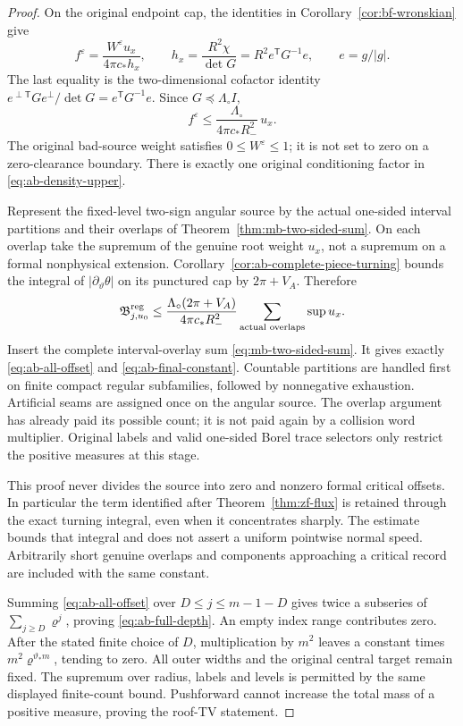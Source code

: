 \begin{proof}
On the original endpoint cap, the identities in
Corollary~\ref{cor:bf-wronskian} give
\[
 f^\varepsilon
       =\frac{W^\varepsilon u_x}{4\pi c_*h_x},\qquad
 h_x=\frac{R^2\chi}{\det G}
       =R^2e^{\mathsf T}G^{-1}e,\qquad e=g/|g|.
\]
The last equality is the two-dimensional cofactor identity
$e^{\perp\mathsf T}Ge^\perp/\det G=e^{\mathsf T}G^{-1}e$.
Since $G\preceq\Lambda_\circ I$,
\begin{equation}\label{eq:ab-density-upper}
              f^\varepsilon
             \le\frac{\Lambda_\circ}{4\pi c_*R_-^2}\,u_x.
\end{equation}
The original bad-source weight satisfies $0\le W^\varepsilon\le1$;
it is not set to zero on a zero-clearance boundary.  There is exactly
one original conditioning factor in \eqref{eq:ab-density-upper}.

Represent the fixed-level two-sign angular source by the actual
one-sided interval partitions and their overlaps of
Theorem~\ref{thm:mb-two-sided-sum}.  On each overlap take the
supremum of the genuine root weight $u_x$, not a supremum on a
formal nonphysical extension.  Corollary~\ref{cor:ab-complete-piece-turning}
bounds the integral of $|\partial_\vartheta\theta|$ on its punctured
cap by $2\pi+V_A$.  Therefore
\[
 \mathfrak B^{\rm reg}_{j,u_0}
 \le\frac{\Lambda_\circ(2\pi+V_A)}{4\pi c_*R_-^2}
          \sum_{\text{actual overlaps}}\sup u_x.
\]
Insert the complete interval-overlay sum
\eqref{eq:mb-two-sided-sum}.  It gives exactly
\eqref{eq:ab-all-offset} and \eqref{eq:ab-final-constant}.
Countable partitions are handled first on finite compact regular
subfamilies, followed by nonnegative exhaustion.  Artificial seams
are assigned once on the angular source.  The overlap argument has
already paid its possible count; it is not paid again by a collision
word multiplier.  Original labels and valid one-sided Borel trace
selectors only restrict the positive measures at this stage.

This proof never divides the source into zero and nonzero formal
critical offsets.  In particular the term identified after
Theorem~\ref{thm:zf-flux} is retained through the exact turning
integral, even when it concentrates sharply.  The estimate bounds
that integral and does not assert a uniform pointwise normal speed.
Arbitrarily short genuine overlaps and components approaching a
critical record are included with the same constant.

Summing \eqref{eq:ab-all-offset} over $D\le j\le m-1-D$ gives
twice a subseries of $\sum_{j\ge D}\varrho^j$, proving
\eqref{eq:ab-full-depth}.  An empty index range contributes zero.
After the stated finite choice of $D$, multiplication by $m^2$
leaves a constant times $m^2\varrho^{\vartheta_*m}$, tending to zero.
All outer widths and the original central target remain fixed.
The supremum over radius, labels and levels is permitted by the
same displayed finite-count bound.  Pushforward cannot increase
the total mass of a positive measure, proving the roof-TV statement.
\end{proof}

